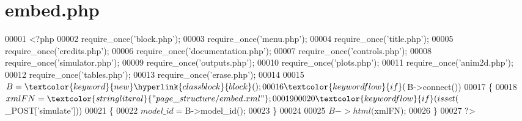 \hypertarget{embed_8php_source}{\section{embed.\-php}
}

\begin{DoxyCode}
00001 <?php
00002 require\_once(\textcolor{stringliteral}{'block.php'});
00003 require\_once(\textcolor{stringliteral}{'menu.php'});
00004 require\_once(\textcolor{stringliteral}{'title.php'});
00005 require\_once(\textcolor{stringliteral}{'credits.php'});
00006 require\_once(\textcolor{stringliteral}{'documentation.php'});
00007 require\_once(\textcolor{stringliteral}{'controls.php'});
00008 require\_once(\textcolor{stringliteral}{'simulator.php'});
00009 require\_once(\textcolor{stringliteral}{'outputs.php'});
00010 require\_once(\textcolor{stringliteral}{'plots.php'});
00011 require\_once(\textcolor{stringliteral}{'anim2d.php'});
00012 require\_once(\textcolor{stringliteral}{'tables.php'});
00013 require\_once(\textcolor{stringliteral}{'erase.php'});
00014 
00015 $B=\textcolor{keyword}{new} \hyperlink{classblock}{block}();
00016 \textcolor{keywordflow}{if}($B->connect())
00017 \{
00018   $xmlFN=\textcolor{stringliteral}{"page\_structure/embed.xml"};
00019 
00020   \textcolor{keywordflow}{if}(isset($\_POST[\textcolor{stringliteral}{'simulate'}]))
00021   \{
00022     $model\_id=$B->model\_id();
00023   \}
00024 
00025   $B->html($xmlFN);
00026 \}
00027 ?>
\end{DoxyCode}
